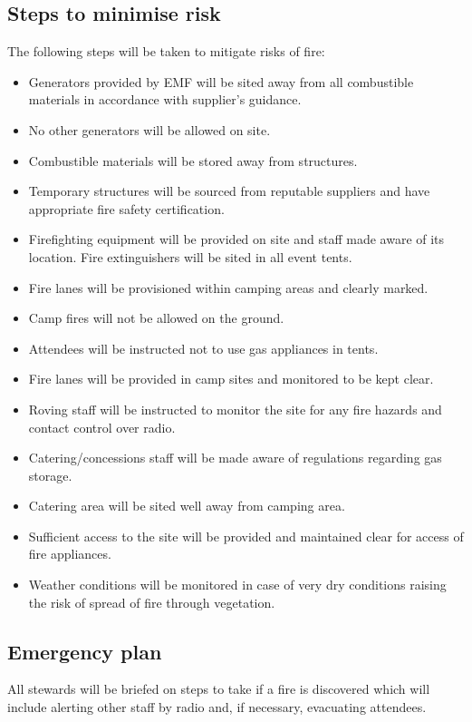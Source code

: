 \subsection{Steps to minimise risk}
The following steps will be taken to mitigate risks of fire:

\begin{itemize}
\item Generators provided by EMF will be sited away from all combustible materials in accordance with supplier's guidance.
\item No other generators will be allowed on site.
\item Combustible materials will be stored away from structures.
\item Temporary structures will be sourced from reputable suppliers and have appropriate fire safety certification.
\item Firefighting equipment will be provided on site and staff made aware of its location. Fire extinguishers will be sited in all event tents.
\item Fire lanes will be provisioned within camping areas and clearly marked.
\item Camp fires will not be allowed on the ground.
\item Attendees will be instructed not to use gas appliances in tents.
\item Fire lanes will be provided in camp sites and monitored to be kept clear.
\item Roving staff will be instructed to monitor the site for any fire hazards and contact control over radio.
\item Catering/concessions staff will be made aware of regulations regarding gas storage.
\item Catering area will be sited well away from camping area.
\item Sufficient access to the site will be provided and maintained clear for access of fire appliances.
\item Weather conditions will be monitored in case of very dry conditions raising the risk of spread of fire through vegetation.
\end{itemize}

\subsection{Emergency plan}

All stewards will be briefed on steps to take if a fire is discovered which will include alerting other staff by radio and, if necessary, evacuating attendees.

